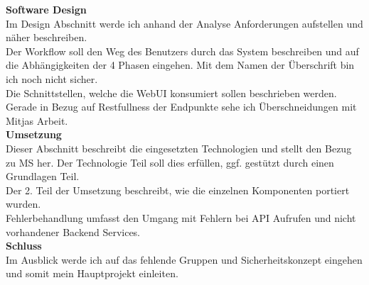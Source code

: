 \documentclass[11pt,a4paper]{article}
\begin{document}
	\textbf{Software Design}\\
	Im Design Abschnitt werde ich anhand der Analyse Anforderungen aufstellen und näher beschreiben.\\
	Der Workflow soll den Weg des Benutzers durch das System beschreiben und auf die Abhängigkeiten der 4 Phasen eingehen. Mit dem Namen der Überschrift bin ich noch nicht sicher.\\
	Die Schnittstellen, welche die WebUI konsumiert sollen beschrieben werden. Gerade in Bezug auf Restfullness der Endpunkte sehe ich Überschneidungen mit Mitjas Arbeit.\\
	
	\textbf{Umsetzung}\\
	Dieser Abschnitt beschreibt die eingesetzten Technologien und stellt den Bezug zu MS her. Der Technologie Teil soll dies erfüllen, ggf. gestützt durch einen Grundlagen Teil.\\
	Der 2. Teil der Umsetzung beschreibt, wie die einzelnen Komponenten portiert wurden.\\
	Fehlerbehandlung umfasst den Umgang mit Fehlern bei API Aufrufen und nicht vorhandener Backend Services.\\

	\textbf{Schluss}\\
	Im Ausblick werde ich auf das fehlende Gruppen und Sicherheitskonzept eingehen und somit mein Hauptprojekt einleiten.
	
	
\end{document}
